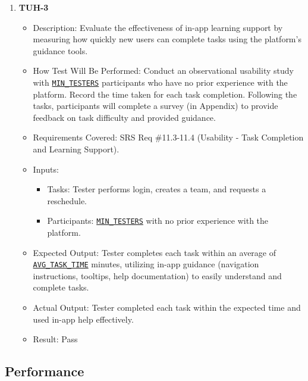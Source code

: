 \documentclass[12pt, titlepage]{article}
\begin{document}
\begin{enumerate}
    \item \textbf{TUH-3}  
    \begin{itemize}
        \item Description: Evaluate the effectiveness of in-app learning support by measuring how quickly new users can complete tasks using the platform’s guidance tools.
        \item How Test Will Be Performed: Conduct an observational usability study with \hyperref[MIN_TESTERS]{\texttt{MIN\_TESTERS}} participants who have no prior experience with the platform. Record the time taken for each task completion. Following the tasks, participants will complete a survey (in Appendix) to provide feedback on task difficulty and provided guidance.
        \item Requirements Covered: SRS Req \#11.3-11.4 (Usability - Task Completion and Learning Support).
        \item Inputs:  
            \begin{itemize}
                \item Tasks: Tester performs login, creates a team, and requests a reschedule.
                \item Participants: \hyperref[MIN_TESTERS]{\texttt{MIN\_TESTERS}} with no prior experience with the platform.
            \end{itemize}
        \item Expected Output: Tester completes each task within an average of \hyperref[AVG_TASK_TIME]{\texttt{AVG\_TASK\_TIME}} minutes, utilizing in-app guidance (navigation instructions, tooltips, help documentation) to easily understand and complete tasks.
        \item Actual Output: Tester completed each task within the expected time and used in-app help effectively.
        \item Result: Pass
    \end{itemize}
\end{enumerate}
		
\subsection{Performance}
\end{document}
